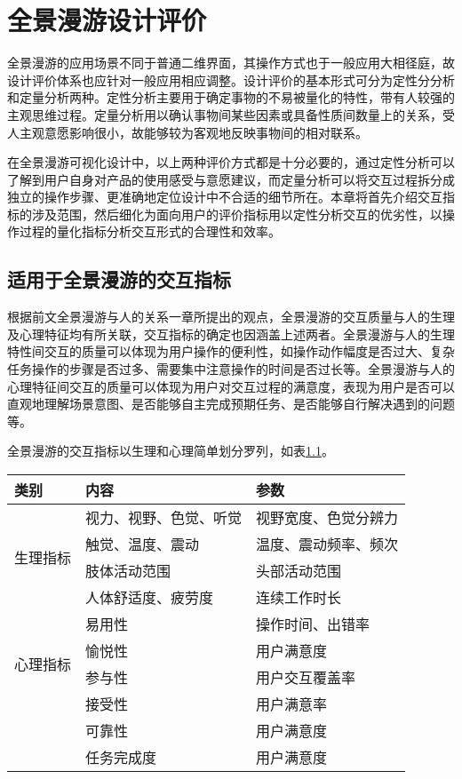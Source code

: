 \chapter{全景漫游设计评价}

全景漫游的应用场景不同于普通二维界面，其操作方式也于一般应用大相径庭，故设计评价体系也应针对一般应用相应调整。设计评价的基本形式可分为定性分分析和定量分析两种。定性分析主要用于确定事物的不易被量化的特性，带有人较强的主观思维过程。定量分析用以确认事物间某些因素或具备性质间数量上的关系，受人主观意愿影响很小，故能够较为客观地反映事物间的相对联系。

在全景漫游可视化设计中，以上两种评价方式都是十分必要的，通过定性分析可以了解到用户自身对产品的使用感受与意愿建议，而定量分析可以将交互过程拆分成独立的操作步骤、更准确地定位设计中不合适的细节所在。本章将首先介绍交互指标的涉及范围，然后细化为面向用户的评价指标用以定性分析交互的优劣性，以操作过程的量化指标分析交互形式的合理性和效率。

\section{适用于全景漫游的交互指标}
根据前文全景漫游与人的关系一章所提出的观点，全景漫游的交互质量与人的生理及心理特征均有所关联，交互指标的确定也因涵盖上述两者。全景漫游与人的生理特性间交互的质量可以体现为用户操作的便利性，如操作动作幅度是否过大、复杂任务操作的步骤是否过多、需要集中注意操作的时间是否过长等。全景漫游与人的心理特征间交互的质量可以体现为用户对交互过程的满意度，表现为用户是否可以直观地理解场景意图、是否能够自主完成预期任务、是否能够自行解决遇到的问题等。

全景漫游的交互指标以生理和心理简单划分罗列，如表\ref{tab:interaction}。

\begin{table}[htbp]
\centering
{}
\vskip 5pt
\begin{tabular}{lll}
\toprule
类别 & 内容 & 参数\\
\midrule
\multirow{4}{*}{生理指标} & 视力、视野、色觉、听觉 & 视野宽度、色觉分辨力 	\\
& 触觉、温度、震动 & 温度、震动频率、频次 \\
& 肢体活动范围 & 头部活动范围 \\
& 人体舒适度、疲劳度 & 连续工作时长 \\
\midrule
\multirow{4}{*}{心理指标} & 易用性 & 操作时间、出错率 \\
& 愉悦性 & 用户满意度  \\
& 参与性 & 用户交互覆盖率  \\
& 接受性 & 用户满意率  \\
& 可靠性 & 用户满意度  \\
& 任务完成度 & 用户满意度  \\
\bottomrule
\end{tabular}
\label{tab:interaction}
\end{table}


